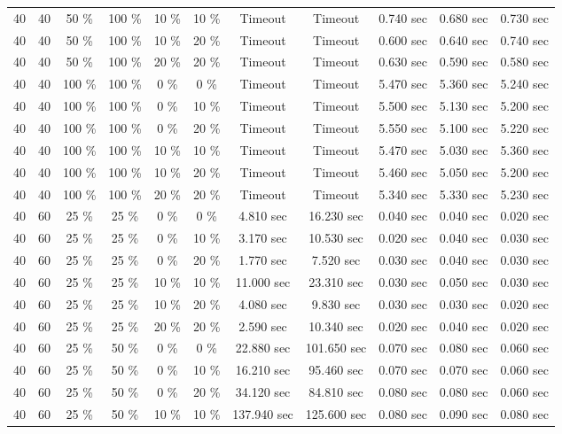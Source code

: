 \documentclass{article}
\begin{document}
\begin{longtable}[]{@{}ccccccccccc@{}}
40 & 40 & 50 \% & 100 \% & 10 \% & 10 \% & Timeout & Timeout & 0.740 sec & 0.680 sec & 0.730 sec \\
40 & 40 & 50 \% & 100 \% & 10 \% & 20 \% & Timeout & Timeout & 0.600 sec & 0.640 sec & 0.740 sec \\
40 & 40 & 50 \% & 100 \% & 20 \% & 20 \% & Timeout & Timeout & 0.630 sec & 0.590 sec & 0.580 sec \\
40 & 40 & 100 \% & 100 \% & 0 \% & 0 \% & Timeout & Timeout & 5.470 sec & 5.360 sec & 5.240 sec \\
40 & 40 & 100 \% & 100 \% & 0 \% & 10 \% & Timeout & Timeout & 5.500 sec & 5.130 sec & 5.200 sec \\
40 & 40 & 100 \% & 100 \% & 0 \% & 20 \% & Timeout & Timeout & 5.550 sec & 5.100 sec & 5.220 sec \\
40 & 40 & 100 \% & 100 \% & 10 \% & 10 \% & Timeout & Timeout & 5.470 sec & 5.030 sec & 5.360 sec \\
40 & 40 & 100 \% & 100 \% & 10 \% & 20 \% & Timeout & Timeout & 5.460 sec & 5.050 sec & 5.200 sec \\
40 & 40 & 100 \% & 100 \% & 20 \% & 20 \% & Timeout & Timeout & 5.340 sec & 5.330 sec & 5.230 sec \\
40 & 60 & 25 \% & 25 \% & 0 \% & 0 \% & 4.810 sec & 16.230 sec & 0.040 sec & 0.040 sec & 0.020 sec \\
40 & 60 & 25 \% & 25 \% & 0 \% & 10 \% & 3.170 sec & 10.530 sec & 0.020 sec & 0.040 sec & 0.030 sec \\
40 & 60 & 25 \% & 25 \% & 0 \% & 20 \% & 1.770 sec & 7.520 sec & 0.030 sec & 0.040 sec & 0.030 sec \\
40 & 60 & 25 \% & 25 \% & 10 \% & 10 \% & 11.000 sec & 23.310 sec & 0.030 sec & 0.050 sec & 0.030 sec \\
40 & 60 & 25 \% & 25 \% & 10 \% & 20 \% & 4.080 sec & 9.830 sec & 0.030 sec & 0.030 sec & 0.020 sec \\
40 & 60 & 25 \% & 25 \% & 20 \% & 20 \% & 2.590 sec & 10.340 sec & 0.020 sec & 0.040 sec & 0.020 sec \\
40 & 60 & 25 \% & 50 \% & 0 \% & 0 \% & 22.880 sec & 101.650 sec & 0.070 sec & 0.080 sec & 0.060 sec \\
40 & 60 & 25 \% & 50 \% & 0 \% & 10 \% & 16.210 sec & 95.460 sec & 0.070 sec & 0.070 sec & 0.060 sec \\
40 & 60 & 25 \% & 50 \% & 0 \% & 20 \% & 34.120 sec & 84.810 sec & 0.080 sec & 0.080 sec & 0.060 sec \\
40 & 60 & 25 \% & 50 \% & 10 \% & 10 \% & 137.940 sec & 125.600 sec & 0.080 sec & 0.090 sec & 0.080 sec \\

\end{longtable}
\end{document}

